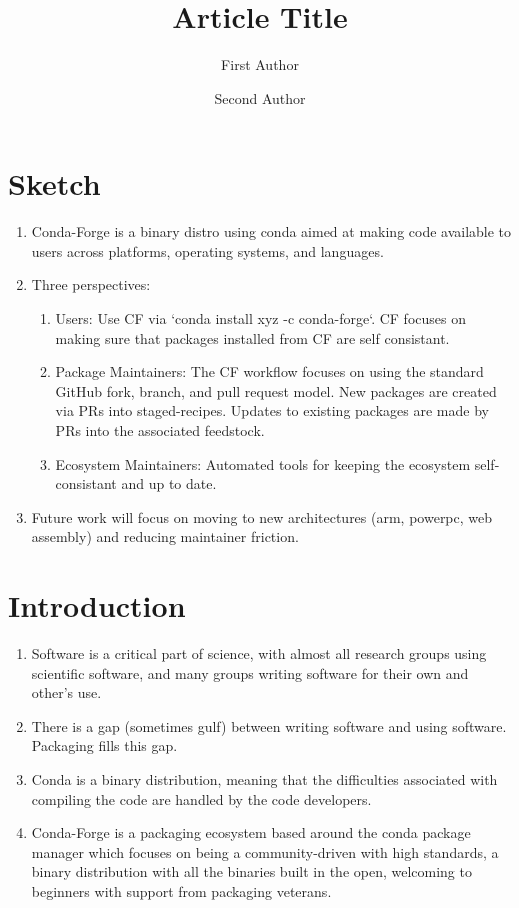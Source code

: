 \documentclass[fleqn,10pt,lineno]{wlpeerj} %
\title{Article Title}
\author[1]{First Author}
\author[2]{Second Author}
\affil[1]{Address of first author}
\affil[2]{Address of second author}
\begin{document}
\flushbottom
\maketitle
\thispagestyle{empty}


\section*{Sketch}
\begin{enumerate}
\item Conda-Forge is a binary distro using conda aimed at making code 
available to users across platforms, operating systems, and languages.
\item Three perspectives:
\begin{enumerate}
\item Users: Use CF via `conda install xyz -c conda-forge`. CF focuses
on making sure that packages installed from CF are self consistant.
\item Package Maintainers: The CF workflow focuses on using the standard 
GitHub fork, branch, and pull request model. New packages are created via 
PRs into staged-recipes. Updates to existing packages are made by PRs into 
the associated feedstock.
\item Ecosystem Maintainers: Automated tools for keeping the ecosystem
self-consistant and up to date.
\end{enumerate}
\item Future work will focus on moving to new architectures (arm, powerpc,
web assembly) and reducing maintainer friction.
\end{enumerate}


\section*{Introduction}
\begin{enumerate}
\item Software is a critical part of science, with almost all research groups
using scientific software, and many groups writing software for their own and
other's use.
\item There is a gap (sometimes gulf) between writing software and using 
software. Packaging fills this gap.
\item Conda is a binary distribution, meaning that the difficulties associated
with compiling the code are handled by the code developers.
\item Conda-Forge is a packaging ecosystem based around the conda package 
manager which focuses on being a community-driven with high standards, a binary 
distribution with all the binaries built in the open, welcoming to beginners 
with support from packaging veterans.
\end{enumerate}
\end{document}
